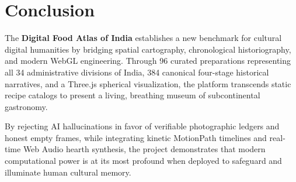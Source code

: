 \documentclass[11pt,a4paper]{report}
\begin{document}
\chapter{Conclusion}
The \textbf{Digital Food Atlas of India} establishes a new benchmark for cultural digital humanities by bridging spatial cartography, chronological historiography, and modern WebGL engineering. Through 96 curated preparations representing all 34 administrative divisions of India, 384 canonical four-stage historical narratives, and a Three.js spherical visualization, the platform transcends static recipe catalogs to present a living, breathing museum of subcontinental gastronomy.

By rejecting AI hallucinations in favor of verifiable photographic ledgers and honest empty frames, while integrating kinetic MotionPath timelines and real-time Web Audio hearth synthesis, the project demonstrates that modern computational power is at its most profound when deployed to safeguard and illuminate human cultural memory.



\end{document}
